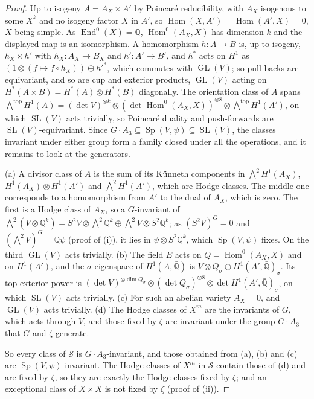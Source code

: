 \documentclass[11pt,reqno]{amsart}
\theoremstyle{plain}
\theoremstyle{definition}
\theoremstyle{remark}
\newcommand{\QQ}{\mathbb{Q}}
\newcommand{\cS}{\mathcal{S}}
\DeclareMathOperator{\End}{End}
\DeclareMathOperator{\Hom}{Hom}
\DeclareMathOperator{\GL}{GL}
\DeclareMathOperator{\SL}{SL}
\DeclareMathOperator{\Sp}{Sp}
\begin{document}
\begin{proof}
Up to isogeny $A=A_{X}\times A'$ by Poincar\'e reducibility, with $A_{X}$
isogenous to some $X^{k}$ and no isogeny factor $X$ in $A'$, so
$\Hom(X,A')=\Hom(A',X)=0$, $X$ being simple. As $\End^{0}(X)=\QQ$,
$\Hom^{0}(A_{X},X)$ has dimension $k$ and the displayed map is an isomorphism.
A homomorphism $h\colon A\to B$ is, up to isogeny, $h_{X}\times h'$ with
$h_{X}\colon A_{X}\to B_{X}$ and $h'\colon A'\to B'$, and $h^{*}$ acts on
$H^{1}$ as $(1\otimes(f\mapsto f\circ h_{X}))\oplus h'^{*}$, which commutes
with $\GL(V)$; so pull-backs are equivariant, and so are cup and exterior
products, $\GL(V)$ acting on $H^{*}(A\times B)=H^{*}(A)\otimes H^{*}(B)$
diagonally. The orientation class of $A$ spans
${\textstyle\bigwedge^{\mathrm{top}}}H^{1}(A)=(\det V)^{\otimes k}\otimes
(\det\Hom^{0}(A_{X},X))^{\otimes8}\otimes{\textstyle\bigwedge^{\mathrm{top}}}H^{1}(A')$, on
which $\SL(V)$ acts trivially, so Poincar\'e duality and push-forwards are
$\SL(V)$-equivariant. Since $G\cdot A_{3}\subseteq\Sp(V,\psi)\subseteq\SL(V)$,
the classes invariant under either group form a family closed under all the
operations, and it remains to look at the generators.

(a) A divisor class of $A$ is the sum of its K\"unneth components in
${\textstyle\bigwedge^{2}}H^{1}(A_{X})$, $H^{1}(A_{X})\otimes H^{1}(A')$ and
${\textstyle\bigwedge^{2}}H^{1}(A')$, which are Hodge classes. The middle one corresponds to a
homomorphism from $A'$ to the dual of $A_{X}$, which is zero. The first is a
Hodge class of $A_{X}$, so a $G$-invariant of ${\textstyle\bigwedge^{2}}(V\otimes\QQ^{k})=
S^{2}V\otimes{\textstyle\bigwedge^{2}}\QQ^{k}\oplus{\textstyle\bigwedge^{2}}V\otimes S^{2}\QQ^{k}$; as
$(S^{2}V)^{G}=0$ and $({\textstyle\bigwedge^{2}}V)^{G}=\QQ\psi$ (proof of
(i)), it lies in
$\psi\otimes S^{2}\QQ^{k}$, which $\Sp(V,\psi)$ fixes. On the third $\GL(V)$
acts trivially. (b) The field $E$ acts on $Q=\Hom^{0}(A_{X},X)$ and on
$H^{1}(A')$, and the $\sigma$-eigenspace of $H^{1}(A,\bar{\QQ})$ is
$V\otimes Q_{\sigma}\oplus H^{1}(A',\bar{\QQ})_{\sigma}$. Its top exterior
power is $(\det V)^{\otimes\dim Q_{\sigma}}\otimes(\det Q_{\sigma})^{\otimes8}
\otimes\det H^{1}(A',\bar{\QQ})_{\sigma}$, on which $\SL(V)$ acts trivially.
(c) For such an abelian variety
$A_{X}=0$, and $\GL(V)$ acts trivially. (d) The Hodge classes of $X^{m}$ are
the invariants of $G$, which acts through $V$, and those fixed by $\zeta$ are
invariant under the group $G\cdot A_{3}$ that $G$ and $\zeta$ generate.

So every class of $\cS$ is $G\cdot A_{3}$-invariant, and those obtained from
(a), (b) and (c) are $\Sp(V,\psi)$-invariant. The Hodge classes of $X^{m}$ in
$\cS$ contain those of (d) and are fixed by $\zeta$, so they are exactly the
Hodge classes fixed by $\zeta$; and an exceptional class of $X\times X$ is not
fixed by $\zeta$ (proof of (ii)).
\end{proof}
\end{document}
